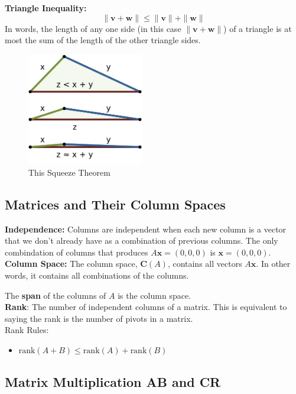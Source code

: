 \documentclass[11pt]{article}
\begin{document}
\textbf{Triangle Inequality:} 
\[\|\boldsymbol{v} + \boldsymbol{w}\| \le \|\boldsymbol{v}\| + \|\boldsymbol{w}\|\]
In words, the length of any one side (in this case $\|\boldsymbol{v}+\boldsymbol{w}\|$) of a 
triangle is at most the sum of the length of the other triangle sides.

\begin{figure}[H] 
	\centering 
	\includegraphics[width=2in]{imgs/triangle_inequality.png}
	\caption{This Squeeze Theorem}
\end{figure}

\subsection{Matrices and Their Column Spaces}

\textbf{Independence:} Columns are independent when each new column is a vector that we don't
already have as a combination of previous columns. The only combindation of columns that produces
$A\boldsymbol{x} = (0,0,0) $ is $ \boldsymbol{x} = (0, 0, 0) $. \\

\textbf{Column Space:} The column space, $\textbf{C}(A)$, contains all vectors 
$A\boldsymbol{x}$. In other words, it contains all combinations of the columns.

The \textbf{span} of the columns of $A$ is the column space. \\

\textbf{Rank}: The number of independent columns of a matrix. This is equivalent to saying the
rank is the number of pivots in a matrix. \\

Rank Rules:
\begin{itemize}
    \item $ \text{rank}(A + B) \le \text{rank}(A) + \text{rank}(B) $
\end{itemize}

\subsection{Matrix Multiplication AB and CR}
\end{document}
